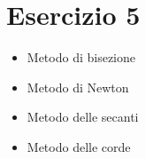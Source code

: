 \section{Esercizio 5}
\begin{itemize}
    \item Metodo di bisezione
    
    \item Metodo di Newton
    
    \item Metodo delle secanti
    
    \item Metodo delle corde
    
\end{itemize}
